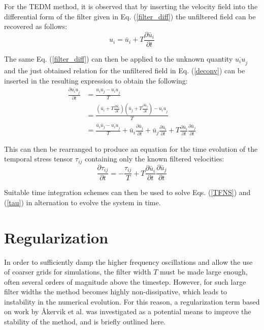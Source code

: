 For the TEDM method, it is observed that by inserting the velocity field into the differential form of the filter given in Eq. (\ref{filter_diff}) the unfiltered field can be recovered as follows:
\begin{equation} \label{deconv}
u_i=\bar{u}_i+T\frac{\partial \bar{u}_i}{\partial t}
\end{equation}

The same Eq. (\ref{filter_diff}) can then be applied to the unknown quantity $\overline{u_i u}_j$ and the just obtained relation for the unfiltered field in Eq. (\ref{deconv}) can be inserted in the resulting expression to obtain the following:
\begin{equation}
\begin{split}
\frac{\partial{\overline{u_i u}_j}}{\partial t}&=\frac{u_i u_j-\overline{u_i u}_j}{T} \\
&=\frac{\left( \bar{u}_i+T\frac{\partial \bar{u}_i}{\partial t} \right) \left( \bar{u}_j+T\frac{\partial \bar{u}_j}{\partial t} \right)-\overline{u_i u}_j}{T} \\
&=\frac{\bar{u}_i \bar{u}_j-\overline{u_i u}_j}{T}+\bar{u}_i\frac{\partial \bar{u}_j}{\partial t}+\bar{u}_j\frac{\partial \bar{u}_i}{\partial t}+T\frac{\partial \bar{u}_i}{\partial t}\frac{\partial \bar{u}_j}{\partial t}
\end{split}
\end{equation}

This can then be rearranged to produce an equation for the time evolution of the temporal stress tensor $\tau_{ij}$ containing only the known filtered velocities:
\begin{equation} \label{tau}
\frac{\partial \tau_{ij}}{\partial t}=-\frac{\tau_{ij}}{T}+T\frac{\partial \bar{u}_i}{\partial t}\frac{\partial \bar{u}_j}{\partial t}
\end{equation}

Suitable time integration schemes can then be used to solve Eqs. (\ref{TFNS}) and (\ref{tau}) in alternation to evolve the system in time.

\section{Regularization} \label{sec:Reg}

In order to sufficiently damp the higher frequency oscillations and allow the use of coarser grids for simulations, the filter width $T$ must be made large enough, often several orders of magnitude above the timestep. However, for such large filter widths the method becomes highly non-dissipative, which leads to instability in the numerical evolution. For this reason, a regularization term based on work by \AA kervik et al. \cite{Akervik2006} was investigated as a potential means to improve the stability of the method, and is briefly outlined here.

